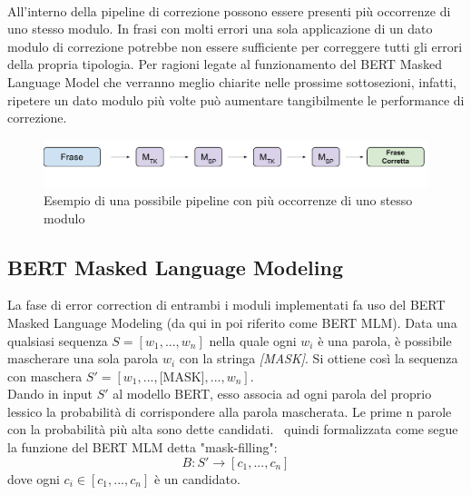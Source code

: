 \ \\
All'interno della pipeline di correzione possono essere presenti più occorrenze di uno stesso modulo. In frasi con molti errori una sola applicazione di un dato modulo di correzione potrebbe non essere sufficiente per correggere tutti gli errori della propria tipologia. Per ragioni legate al funzionamento del BERT Masked Language Model che verranno meglio chiarite nelle prossime sottosezioni, infatti, ripetere un dato modulo più volte può aumentare tangibilmente le performance di correzione.

\begin{figure}[H]
\centering
\includegraphics[width=\textwidth]{immagini/metodologia/pipeline_esempio}
\caption{Esempio di una possibile pipeline con più occorrenze di uno stesso modulo}
\label{fig:met_pipeline_esempio}
\end{figure}




\subsection{BERT Masked Language Modeling}
\label{sec:met_BERT_MLM}
La fase di error correction di entrambi i moduli implementati fa uso del BERT Masked Language Modeling (da qui in poi riferito come BERT MLM). Data una qualsiasi sequenza $S = [w_1,...,w_n]$ nella quale ogni $w_i$ è una parola, è possibile mascherare una sola parola $w_i$ con la stringa \textit{[MASK]}. Si ottiene così la sequenza con maschera $S\prime = [w_1,...,\text{[MASK]},...,w_n]$.\\
Dando in input $S\prime$ al modello BERT, esso associa ad ogni parola del proprio lessico la probabilità di corrispondere alla parola mascherata. Le prime n parole con la probabilità più alta sono dette candidati.
\E\ quindi formalizzata come segue la funzione del BERT MLM detta "mask-filling":
\begin{equation} \label{eq:met_BERT}
B: S\prime \rightarrow [c_1,...,c_n]
\end{equation}
dove ogni $c_i \in[c_1,...,c_n]$ è un candidato. 

